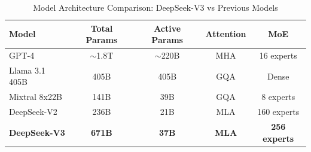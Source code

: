 


\begin{table}[htbp]
\centering
\caption{Model Architecture Comparison: DeepSeek-V3 vs Previous Models}
\label{tab:model-comparison}
\begin{tabular}{@{}lcccc@{}}
\toprule
\textbf{Model} & \textbf{Total Params} & \textbf{Active Params} & \textbf{Attention} & \textbf{MoE} \\
\midrule
GPT-4 & $\sim$1.8T & $\sim$220B & MHA & 16 experts \\
Llama 3.1 405B & 405B & 405B & GQA & Dense \\
Mixtral 8x22B & 141B & 39B & GQA & 8 experts \\
DeepSeek-V2 & 236B & 21B & MLA & 160 experts \\
\textbf{DeepSeek-V3} & \textbf{671B} & \textbf{37B} & \textbf{MLA} & \textbf{256 experts} \\
\bottomrule
\end{tabular}
\end{table}


